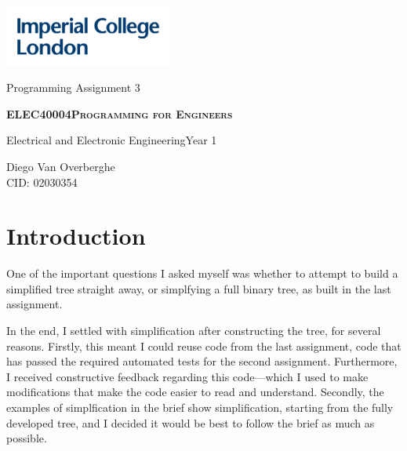 \documentclass[12pt]{article}
\newcommand{\documenttype}{Programming Assignment 3}
\newcommand{\modulecode}{ELEC40004}
\newcommand{\modulename}{Programming for Engineers}
\newcommand{\cid}{02030354}
\newcommand{\degreeyear}{1}
\newcommand{\degree}{Electrical and Electronic Engineering}
\newcommand{\authorfullname}{Diego Van Overberghe}
\begin{document}
\thispagestyle{empty}
\includegraphics[height=2cm]{rsc/IMP_ML_1CS_4CP_CLEAR-SPACE.png}
    \vspace{4cm}
    \begin{center}
        \LARGE \documenttype
    \end{center}
    \vspace{1cm}
    \begin{center}
        \textsc{\LARGE \bfseries \modulecode \quad \modulename}
    \end{center}
    \begin{center}
        {\Large \degree \quad Year \degreeyear}
    \end{center}
    \vspace{1cm}
    \begin{center}
        {\Large \authorfullname \\[1ex] CID: \cid}
    \end{center}

    \newpage

    \section{Introduction}

    One of the important questions I asked myself was whether to attempt to build a simplified tree straight away, or simplfying a full binary tree, as built in the last assignment.

    In the end, I settled with simplification after constructing the tree, for several reasons. Firstly, this meant I could reuse code from the last assignment, code that has passed the required automated tests for the second assignment. Furthermore, I received constructive feedback regarding this code---which I used to make modifications that make the code easier to read and understand. Secondly, the examples of simplfication in the brief show simplification, starting from the fully developed tree, and I decided it would be best to follow the brief as much as possible.
\end{document}
